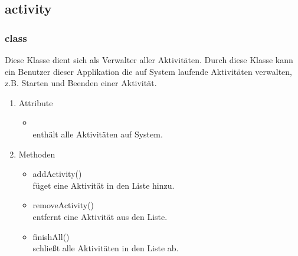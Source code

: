 \documentclass[a4paper]{scrreprt}
\begin{document}
{            \subsection{activity}

                \subsubsection{class }
                Diese Klasse dient sich als Verwalter aller Aktivitäten. Durch diese Klasse kann ein Benutzer dieser Applikation die auf System laufende Aktivitäten verwalten, z.B. Starten und Beenden einer Aktivität.
                \begin{enumerate}
                \item Attribute
                     \begin{itemize}
                            \item {\large{}}\\
                            enthält alle Aktivitäten auf System.
                     \end{itemize}
                \item Methoden
                     \begin{itemize}
                                \item {\large addActivity()}\\
                                füget eine Aktivität in den Liste hinzu.
                                \item {\large removeActivity()}\\
                                entfernt eine Aktivität aus den Liste.
                                \item {\large finishAll()}\\
                                schließt alle Aktivitäten in den Liste ab.
                     \end{itemize}
                \end{enumerate}
}
\end{document}
